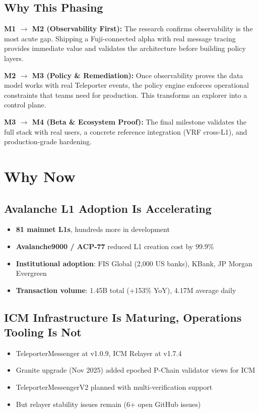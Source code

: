 \documentclass[11pt,a4paper]{article}
\begin{document}
\subsection{Why This Phasing}

\textbf{M1 $\rightarrow$ M2 (Observability First):} The research confirms observability is the most acute gap. Shipping a Fuji-connected alpha with real message tracing provides immediate value and validates the architecture before building policy layers.

\textbf{M2 $\rightarrow$ M3 (Policy \& Remediation):} Once observability proves the data model works with real Teleporter events, the policy engine enforces operational constraints that teams need for production. This transforms an explorer into a control plane.

\textbf{M3 $\rightarrow$ M4 (Beta \& Ecosystem Proof):} The final milestone validates the full stack with real users, a concrete reference integration (VRF cross-L1), and production-grade hardening.

\section{Why Now}

\subsection{Avalanche L1 Adoption Is Accelerating}

\begin{itemize}
  \item \textbf{81 mainnet L1s}, hundreds more in development
  \item \textbf{Avalanche9000 / ACP-77} reduced L1 creation cost by 99.9\%
  \item \textbf{Institutional adoption}: FIS Global (2,000 US banks), KBank, JP Morgan Evergreen
  \item \textbf{Transaction volume}: 1.45B total (+153\% YoY), 4.17M average daily
\end{itemize}

\subsection{ICM Infrastructure Is Maturing, Operations Tooling Is Not}

\begin{itemize}
  \item TeleporterMessenger at v1.0.9, ICM Relayer at v1.7.4
  \item Granite upgrade (Nov 2025) added epoched P-Chain validator views for ICM
  \item TeleporterMessengerV2 planned with multi-verification support
  \item But relayer stability issues remain (6+ open GitHub issues)
\end{itemize}
\end{document}
